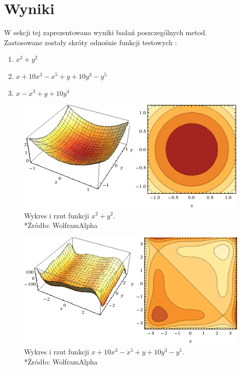 \documentclass{classrep}
\begin{document}
\section{Wyniki}
W sekcji tej zaprezentowano wyniki badań poszczególnych metod.\\
Zastosowane zostały skróty odnośnie funkcji testowych :
\begin{enumerate}
\item $x^2+y^2$
\item $x+10x^3-x^5 +y+10y^3-y^5$
\item $x-x^3 +y+10y^4$
\end{enumerate}

\begin{figure}[H]
\centering
\includegraphics[width=12cm]{obrazy/funkcja_1} 
\caption{Wykres i rzut funkcji $x^2+y^2$.\\*{\footnotesize Źródło: WolframAlpha}}
\label{fig:funkcja_1}
\end{figure}

\begin{figure}[H]
\centering
\includegraphics[width=12cm]{obrazy/funkcja_2} 
\caption{Wykres i rzut funkcji $x+10x^3-x^5 +y+10y^3-y^5$.\\*{\footnotesize Źródło: WolframAlpha}}
\label{fig:funkcja_2}
\end{figure}
\end{document}
